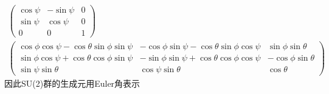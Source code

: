 {{{\begin{displaymath}
\begin{aligned}
			\begin{pmatrix}
				\cos\psi &-\sin\psi &0\\
				\sin\psi &\cos\psi &0\\
				0 &0 &1
			\end{pmatrix}\\
			\begin{pmatrix}
				\cos\phi\cos\psi-\cos\theta\sin\phi\sin\psi &-\cos\phi\sin\psi-\cos\theta\sin\phi\cos\psi &\sin\phi\sin\theta\\
				\sin\phi\cos\psi+\cos\theta\cos\phi\sin\psi &-\sin\phi\sin\psi+\cos\theta\cos\phi\cos\psi &-\cos\phi\sin\theta\\
				\sin\psi\sin\theta &\cos\psi\sin\theta &\cos\theta
			\end{pmatrix}
		\end{aligned}
	\end{displaymath}
因此\textrm{SU(2)}群的生成元用\textrm{Euler}角表示
}}
}

